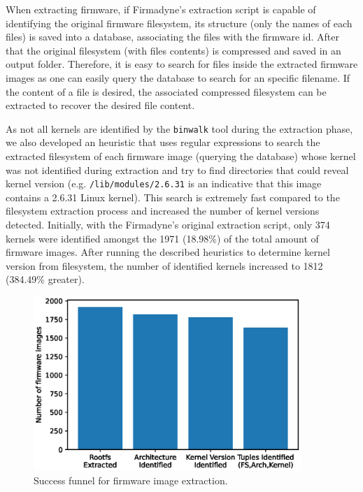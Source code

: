 When extracting firmware, if Firmadyne's extraction script is capable of identifying the original firmware filesystem, its structure (only the names of each files) is saved into a database, associating the files with the firmware id. After that the original filesystem (with files contents) is compressed and saved in an output folder. Therefore, it is easy to search for files inside the extracted firmware images as one can easily query the database to search for an specific filename. If the content of a file is desired, the associated compressed filesystem can be extracted to recover the desired file content.

As not all kernels are identified by the {\tt binwalk} tool during the extraction phase, we also developed an heuristic that uses regular expressions to search the extracted filesystem of each firmware image (querying the database) whose kernel was not identified during extraction and try to find directories that could reveal kernel version (e.g. {\tt /lib/modules/2.6.31} is an indicative that this image contains a 2.6.31 Linux kernel). This search is extremely fast compared to the filesystem extraction process and increased the number of kernel versions detected. Initially, with the Firmadyne's \cite{firmadyne} original extraction script, only 374 kernels were identified amongst the 1971 (18.98\%) of the total amount of firmware images. After running the described heuristics to determine kernel version from filesystem, the number of identified kernels increased to 1812 (384.49\% greater).


\begin{figure}[h]
    \centering
    \includegraphics[width=0.90\textwidth]{figs/extraction_funnel.eps}
    \caption{Success funnel for firmware image extraction.}
    \label{fig:stats-funnel}
\end{figure}


